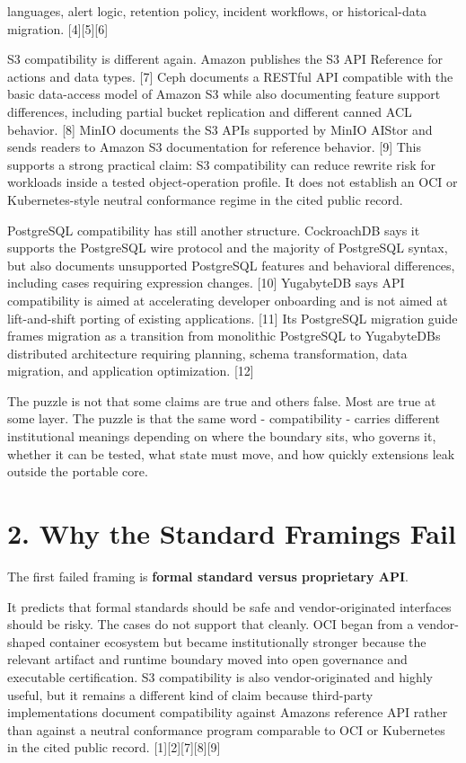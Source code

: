 \documentclass[11pt]{article}
\begin{document}
languages, alert logic, retention policy, incident workflows, or historical-data migration. {[}4{]}{[}5{]}{[}6{]}

S3 compatibility is different again. Amazon publishes the S3 API Reference for actions and data types. {[}7{]} Ceph documents a RESTful API compatible with the basic data-access model of Amazon S3 while also documenting feature support differences, including partial bucket replication and different canned ACL behavior. {[}8{]} MinIO documents the S3 APIs supported by MinIO AIStor and sends readers to Amazon S3 documentation for reference behavior. {[}9{]} This supports a strong practical claim: S3 compatibility can reduce rewrite risk for workloads inside a tested object-operation profile. It does not establish an OCI or Kubernetes-style neutral conformance regime in the cited public record.

PostgreSQL compatibility has still another structure. CockroachDB says it supports the PostgreSQL wire protocol and the majority of PostgreSQL syntax, but also documents unsupported PostgreSQL features and behavioral differences, including cases requiring expression changes. {[}10{]} YugabyteDB says API compatibility is aimed at accelerating developer onboarding and is not aimed at lift-and-shift porting of existing applications. {[}11{]} Its PostgreSQL migration guide frames migration as a transition from monolithic PostgreSQL to YugabyteDB\textquotesingle s distributed architecture requiring planning, schema transformation, data migration, and application optimization. {[}12{]}

The puzzle is not that some claims are true and others false. Most are true at some layer. The puzzle is that the same word - compatibility - carries different institutional meanings depending on where the boundary sits, who governs it, whether it can be tested, what state must move, and how quickly extensions leak outside the portable core.

\section{2. Why the Standard Framings Fail}\label{why-the-standard-framings-fail}

The first failed framing is \textbf{formal standard versus proprietary API}.

It predicts that formal standards should be safe and vendor-originated interfaces should be risky. The cases do not support that cleanly. OCI began from a vendor-shaped container ecosystem but became institutionally stronger because the relevant artifact and runtime boundary moved into open governance and executable certification. S3 compatibility is also vendor-originated and highly useful, but it remains a different kind of claim because third-party implementations document compatibility against Amazon\textquotesingle s reference API rather than against a neutral conformance program comparable to OCI or Kubernetes in the cited public record. {[}1{]}{[}2{]}{[}7{]}{[}8{]}{[}9{]}
\end{document}
